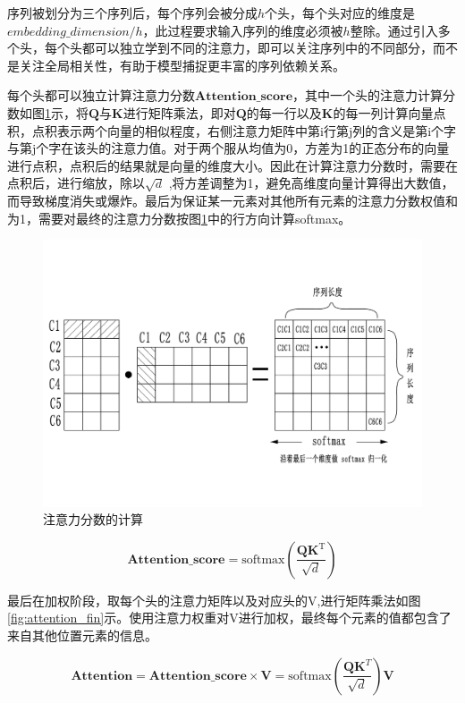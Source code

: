 序列被划分为三个序列后，每个序列会被分成$h$个头，每个头对应的维度是${embedding\_dimension}/{h}$，此过程要求输入序列的维度必须被$h$整除。通过引入多个头，每个头都可以独立学到不同的注意力，即可以关注序列中的不同部分，而不是关注全局相关性，有助于模型捕捉更丰富的序列依赖关系。

每个头都可以独立计算注意力分数$\mathbf{Attention\_score}$，其中一个头的注意力计算分数如图\ref{fig:attention_softmax}示，将$\mathbf{Q}$与$\mathbf{K}$进行矩阵乘法，即对$\mathbf{Q}$的每一行以及$\mathbf{K}$的每一列计算向量点积，点积表示两个向量的相似程度，右侧注意力矩阵中第i行第j列的含义是第i个字与第j个字在该头的注意力值。对于两个服从均值为0，方差为1的正态分布的向量进行点积，点积后的结果就是向量的维度大小。因此在计算注意力分数时，需要在点积后，进行缩放，除以$\sqrt{d}$  ,将方差调整为1，避免高维度向量计算得出大数值，而导致梯度消失或爆炸。最后为保证某一元素对其他所有元素的注意力分数权值和为1，需要对最终的注意力分数按图\ref{fig:attention_softmax}中的行方向计算softmax。
\begin{figure}[htbp]
    \centering
    \includegraphics[width=0.8\linewidth]{img/multimodal/attention_softmax.pdf}
    \caption{注意力分数的计算 }
    \label{fig:attention_softmax}
\end{figure}
\begin{equation}
{\mathbf{Attention\_score}} = {\mathrm{softmax}}\left(\frac{\mathbf{Q}\mathbf{K}^{\mathrm{T}}}{\sqrt{d}}\right)
\end{equation}


最后在加权阶段，取每个头的注意力矩阵以及对应头的V,进行矩阵乘法如图\ref{fig:attention_fin}示。使用注意力权重对V进行加权，最终每个元素的值都包含了来自其他位置元素的信息。

\begin{equation}
{\mathbf{Attention}}=\mathbf{Attention\_score} \times \mathbf{V}= {\mathrm{softmax}}\left(\frac{\mathbf{Q}\mathbf{K}^T}{\sqrt{d}}\right)\mathbf{V}
\end{equation}

